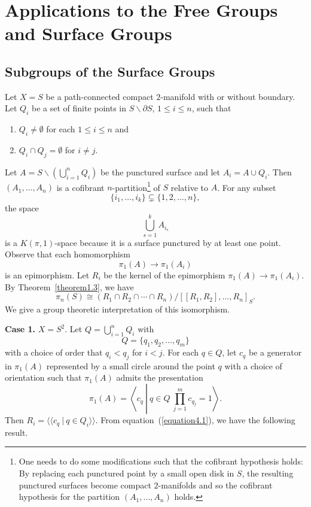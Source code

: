 \documentclass[10pt]{amsart}
\let\la=\langle
\let\ra=\rangle
\numberwithin{equation}{section}
\begin{document}
\section{Applications to the Free Groups and Surface Groups}\label{section4}
\subsection{Subgroups of the Surface Groups}
Let $X=S$ be a path-connected compact $2$-manifold with or without boundary. Let $Q_i$ be a set of finite points in $S\smallsetminus \partial S$, $1\leq i\leq n$, such that
\begin{enumerate}
\item $Q_i\not=\emptyset$ for each $1\leq i\leq n$ and
\item $Q_i\cap Q_j=\emptyset$ for $i\not=j$.
\end{enumerate}
Let $
A=S\smallsetminus\left(\bigcup_{i=1}^n Q_i\right)
$
be the punctured surface and let $A_i=A\cup Q_i$. Then $(A_1,\ldots,A_n)$ is a cofibrant $n$-partition\footnote{One needs to do some modifications such that the cofibrant hypothesis holds: By replacing each punctured point by a small open disk in $S$, the resulting punctured surfaces become compact $2$-manifolds and so the cofibrant hypothesis for the partition $(A_1,\ldots,A_n)$ holds.}\label{footnote1} of $S$ relative to $A$.  For any subset $$\{i_1,\ldots,i_k\}\subsetneq \{1,2,\ldots,n\},$$ the space
$$
\bigcup_{s=1}^k A_{i_s}
$$
is a $K(\pi,1)$-space because it is a surface punctured  by at least
one point. Observe that each homomorphism
$$
\pi_1(A)\longrightarrow \pi_1(A_i)
$$
is an epimorphism. Let $R_i$ be the kernel of the epimorphism $\pi_1(A)\to \pi_1(A_i)$. By Theorem~\ref{theorem1.3}, we have
\begin{equation}\label{equation4.1}
\pi_n(S)\cong (R_1\cap R_2\cap\cdots\cap R_n)/[[R_1,R_2],\ldots,R_n]_S.
\end{equation}
We give a group theoretic interpretation of this isomorphism.

\bigskip

\noindent\textbf{Case 1.} $X=S^2$. Let $Q=\bigcup_{i=1}^nQ_i$ with
$$
Q=\{q_1,q_2,\ldots,q_m\}
$$
with a choice of order that $q_i<q_j$ for $i<j$. For each $q\in Q$, let $c_q$ be a generator in $\pi_1(A)$ represented by a small circle around the point $q$ with a choice of orientation such that $\pi_1(A)$ admits the presentation
$$
\pi_1(A)=\left\la c_q \ \left| \ q\in Q\ \prod_{j=1}^mc_{q_j}=1\right. \right\ra.
$$
Then $R_i=\la\la c_q \ | \ q\in Q_i\ra\ra$. From equation~(\ref{equation4.1}), we have the following result.
\end{document}
